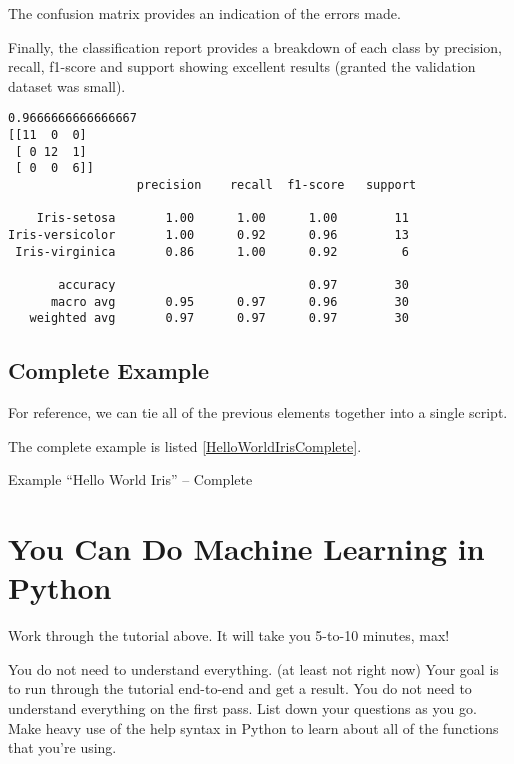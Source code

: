 The confusion matrix provides an indication of the errors made.
    
Finally, the classification report provides a breakdown of each class by precision, recall, f1-score and support showing excellent results (granted the validation dataset was small).
   
\medskip

\begin{lstlisting}
0.9666666666666667
[[11  0  0]
 [ 0 12  1]
 [ 0  0  6]]
                  precision    recall  f1-score   support
    
    Iris-setosa       1.00      1.00      1.00        11
Iris-versicolor       1.00      0.92      0.96        13
 Iris-virginica       0.86      1.00      0.92         6
    
       accuracy                           0.97        30
      macro avg       0.95      0.97      0.96        30
   weighted avg       0.97      0.97      0.97        30
\end{lstlisting}    
    
\subsection{Complete Example}

For reference, we can tie all of the previous elements together into a single script.

The complete example is listed \ref{HelloWorldIrisComplete}.

\medskip

\begin{code}
      
    
  \caption{Example ``Hello World Iris'' -- Complete}\label{HelloWorldIrisComplete}
\end{code}      
        
\section{You Can Do Machine Learning in Python}
 
Work through the tutorial above. It will take you 5-to-10 minutes, max!
     
You do not need to understand everything. (at least not right now) Your goal is to run through the tutorial end-to-end and get a result. You do not need to understand everything on the first pass. List down your questions as you go. Make heavy use of the  help syntax in Python to learn about all of the functions that you're using.
     
